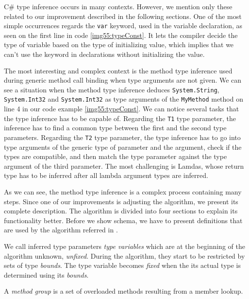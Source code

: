 C\# type inference occurs in many contexts. 
However, we mention only these related to our improvement described in the following sections. 
One of the most simple occurrences regards the \texttt{var} keyword, used in the variable declaration, as seen on the first line in code \ref{img55:typeConst}. It lets the compiler decide the type of variable based on the type of initializing value, which implies that we can’t use the keyword in declarations without initializing the value.
\par
The most interesting and complex context is the method type inference used during generic method call binding when type arguments are not given. 
We can see a situation when the method type inference deduces \texttt{System.String}, \texttt{System.Int32} and \texttt{System.Int32} as type arguments of the \texttt{MyMethod} method on line 4 in our code example \ref{img55:typeConst}. 
We can notice several tasks that the type inference has to be capable of.
Regarding the \texttt{T1} type parameter, the inference has to find a common type between the first and the second type parameters. 
Regarding the \texttt{T2} type parameter, the type inference has to go into type arguments of the generic type of parameter and the argument, check if the types are compatible, and then match the type parameter against the type argument of the third parameter. 
The most challenging is Lamdas, whose return type has to be inferred after all lambda argument types are inferred.
\par
As we can see, the method type inference is a complex process containing many steps.
Since one of our improvements is adjusting the algorithm, we present its complete description.
The algorithm is divided into four sections to explain its functionality better.
Before we show schema, we have to present definitions that are used by the algorithm referred in \cite{online:csTypeInference}.
\par
\begin{defn}
We call inferred type parameters \emph{type variables} which are at the beginning of the algorithm unknown, \emph{unfixed}. 
During the algorithm, they start to be restricted by sets of type \emph{bounds}.
The type variable becomes \emph{fixed} when the its actual type is determined using its \emph{bounds}.
\end{defn}
\begin{defn}
A \emph{method group} is a set of overloaded methods resulting from a member lookup.
\end{defn}
